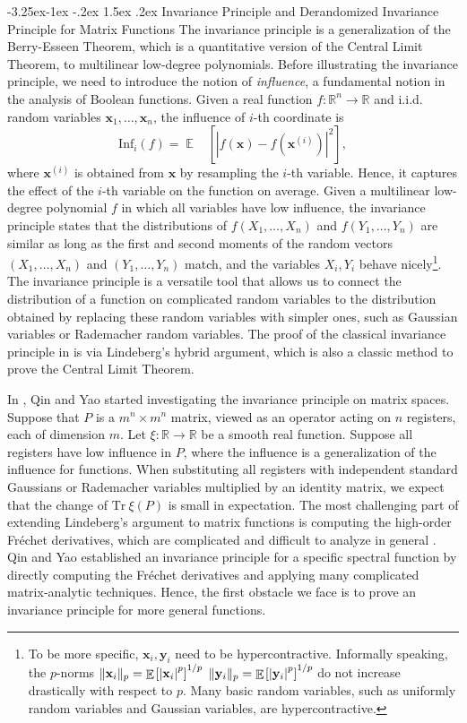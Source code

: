 \documentclass[10pt,a4paper]{article}
\makeatletter
\renewcommand{\subsubsection}{\@startsection{subsubsection}{2}{\z@}%
             {-3.25ex\@plus -1ex \@minus -.2ex}%
             {1.5ex \@plus .2ex}%
             {\normalfont\normalsize\scshape\bfseries}}
\theoremstyle{plain}
\theoremstyle{definition}
\newcommand {\minusspace} {\: \! \!}
\newcommand {\Fn} [2] {\ensuremath{ #1 \minusspace \Br{ #2 } }}
\newcommand{\reals}{{\mathbb R}}
\newcommand {\br} [1] {\ensuremath{ \left( #1 \right) }}
\newcommand {\Br} [1] {\ensuremath{ \left[ #1 \right] }}
\DeclarePairedDelimiter{\norm}{\lVert}{\rVert}
\newcommand {\ab} [1] {\ensuremath{ \left| #1 \right| }}
\DeclareMathOperator*{\bigE}{\mathbb{E}}
\newcommand {\expec} [2] {\Fn{\bigE_{\substack{#1}}}{#2}}
\newcommand {\Tr} {\ensuremath{ \mathrm{Tr} }}
\newcommand{\randx}{\ensuremath{\mathbf{x}}}
\newcommand{\randy}{\ensuremath{\mathbf{y}}}
\newcommand{\infi}[1]{\ensuremath{\mathrm{Inf}_i}\br{#1}}
\newcommand{\1}{\mathbb{1}} %
\makeatother
\begin{document}
\subsubsection{Invariance Principle and Derandomized Invariance Principle for Matrix Functions} The invariance principle \cite{mossel2005noise} is a generalization of the Berry-Esseen Theorem, which is a quantitative version of the Central Limit Theorem, to multilinear low-degree polynomials. 
Before illustrating the invariance principle, we need to introduce the notion of {\em influence}, a fundamental notion in the analysis of Boolean functions. Given a real function $f:\reals^n\rightarrow\reals$ and i.i.d. random variables $\randx_1,\ldots, \randx_n$, the influence of $i$-th coordinate is 
\[\infi{f}=\expec{}{\ab{f\br{\randx}-f\br{\randx^{(i)}}}^2},\]
where $\randx^{(i)}$ is obtained from $\randx$ by resampling the $i$-th variable.  Hence, it captures the effect of the $i$-th variable on the function on average. Given a multilinear low-degree polynomial $f$ in which all variables have low influence, the invariance principle states that the distributions of $f\br{X_1,\ldots, X_n}$ and $f(Y_1,\ldots, Y_n)$ are similar as long as the first and second moments of the random vectors $\br{X_1,\ldots, X_n}$ and $(Y_1,\ldots, Y_n)$ match, and the variables $X_i, Y_i$ behave nicely\footnote{To be more specific, $\randx_i, \randy_i$ need to be hypercontractive. Informally speaking, the $p$-norms  $\norm{\randx_i}_p=\expec{}{\ab{\randx_i}^p}^{1/p}$ $\norm{\randy_i}_p=\expec{}{\ab{\randy_i}^p}^{1/p}$ do not increase drastically with respect to $p$. Many basic random variables, such as uniformly random variables and Gaussian variables, are hypercontractive.}. The invariance principle is a versatile tool that allows us to connect the distribution of a function on complicated random variables to the distribution obtained by replacing these random variables with simpler ones, such as Gaussian variables or Rademacher random variables. The proof of the classical invariance principle in \cite{mossel2005noise} is via Lindeberg's hybrid argument, which is also a classic method to prove the Central Limit Theorem.

In \cite{qin2021nonlocal}, Qin and Yao started investigating the invariance principle on matrix spaces. Suppose that $P$ is a $m^n\times m^n$ matrix, viewed as an operator acting on $n$ registers, each of dimension $m$. 
Let $\xi:\reals\rightarrow\reals$ be a smooth real function. Suppose all registers have low influence in $P$, where the influence is a generalization of the influence for functions. When substituting all registers with independent standard Gaussians or Rademacher variables multiplied by an identity matrix, we expect that the change of $\Tr~\xi(P)$ is small in expectation. The most challenging part of extending Lindeberg's argument to matrix functions is computing the high-order Fr\'echet derivatives, which are complicated and difficult to analyze in general \cite{SENDOV2007240}. Qin and Yao \cite{qin2021nonlocal} established an invariance principle for a specific spectral function by directly computing the Fr\'echet derivatives and applying many complicated matrix-analytic techniques.
Hence, the first obstacle we face is to prove an invariance principle for more general functions.
\end{document}
